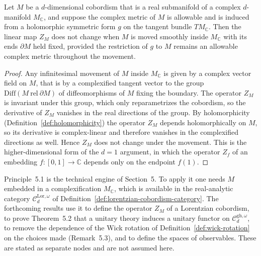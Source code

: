 \begin{proposition}
  \label{prop:invariance-principle}
  \notready
  Let $M$ be a $d$-dimensional cobordism that is a real submanifold of a complex
  $d$-manifold $M_{\mathbb C}$, and suppose the complex metric of $M$ is allowable
  and is induced from a holomorphic symmetric form $g$ on the tangent bundle
  $TM_{\mathbb C}$. Then the linear map $Z_M$ does not change when $M$ is moved
  smoothly inside $M_{\mathbb C}$ with its ends $\partial M$ held fixed, provided the
  restriction of $g$ to $M$ remains an allowable complex metric throughout the
  movement.
\end{proposition}

\begin{proof}
  Any infinitesimal movement of $M$ inside $M_{\mathbb C}$ is given by a complex
  vector field on $M$, that is by a complexified tangent vector to the group
  $\mathrm{Diff}(M \ \mathrm{rel}\ \partial M)$ of diffeomorphisms of $M$ fixing the
  boundary. The operator $Z_M$ is invariant under this group, which only
  reparametrizes the cobordism, so the derivative of $Z_M$ vanishes in the real
  directions of the group. By holomorphicity (Definition~\ref{def:holomorphicity})
  the operator $Z_M$ depends holomorphically on $M$, so its derivative is
  complex-linear and therefore vanishes in the complexified directions as well.
  Hence $Z_M$ does not change under the movement. This is the higher-dimensional
  form of the $d = 1$ argument, in which the operator $Z_f$ of an embedding
  $f \colon [0,1] \to \mathbb C$ depends only on the endpoint $f(1)$.
\end{proof}

Principle~5.1 is the technical engine of Section~5. To apply it one needs $M$
embedded in a complexification $M_{\mathbb C}$, which is available in the
real-analytic category $\mathcal C_d^{\mathrm{Lor},\omega}$ of
Definition~\ref{def:lorentzian-cobordism-category}. The forthcoming results use it
to define the operator $Z_M$ of a Lorentzian cobordism, to prove Theorem~5.2 that a
unitary theory induces a unitary functor on $\mathcal C_d^{\mathrm{gh},\omega}$, to
remove the dependence of the Wick rotation of Definition~\ref{def:wick-rotation} on
the choices made (Remark~5.3), and to define the spaces of observables. These are
stated as separate nodes and are not assumed here.

